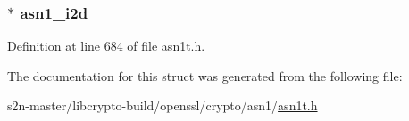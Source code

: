 \subsubsection[{\texorpdfstring{asn1\+\_\+i2d}{asn1_i2d}}]{ $\ast$ asn1\+\_\+i2d}\hypertarget{struct_a_s_n1___c_o_m_p_a_t___f_u_n_c_s__st_a4f09cb1cb676925b22d2408d6a96f781}{}\label{struct_a_s_n1___c_o_m_p_a_t___f_u_n_c_s__st_a4f09cb1cb676925b22d2408d6a96f781}


Definition at line 684 of file asn1t.\+h.



The documentation for this struct was generated from the following file\+:\begin{DoxyCompactItemize}
\item 
s2n-\/master/libcrypto-\/build/openssl/crypto/asn1/\hyperlink{crypto_2asn1_2asn1t_8h}{asn1t.\+h}\end{DoxyCompactItemize}
